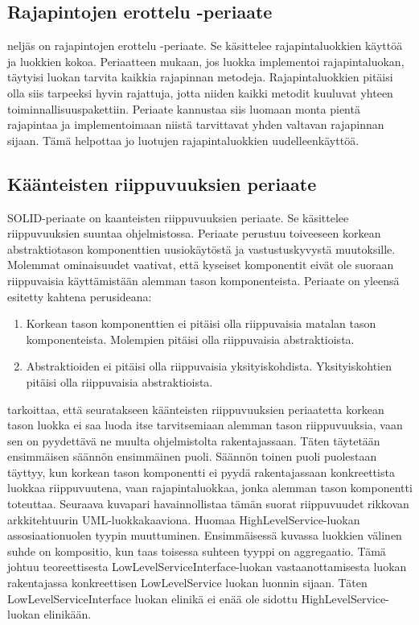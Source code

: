 \documentclass{tufte-book}
\begin{document}
\subsection{Rajapintojen erottelu -periaate}
\label{ISP}

 neljäs on \gls{rajapintojen erottelu -periaate}. Se käsittelee
rajapintaluokkien käyttöä ja luokkien kokoa. Periaatteen mukaan, jos luokka implementoi
rajapintaluokan, täytyisi luokan tarvita kaikkia rajapinnan metodeja. Rajapintaluokkien pitäisi
olla siis tarpeeksi hyvin rajattuja, jotta niiden kaikki metodit kuuluvat yhteen
toiminnallisuuspakettiin. Periaate kannustaa siis luomaan monta pientä rajapintaa ja
implementoimaan niistä tarvittavat yhden valtavan rajapinnan sijaan. Tämä helpottaa jo luotujen
rajapintaluokkien uudelleenkäyttöä.

\subsection{Käänteisten riippuvuuksien periaate}
\label{DIP}

 SOLID-periaate on \gls{kaanteisten riippuvuuksien periaate}. Se
käsittelee riippuvuuksien suuntaa ohjelmistossa. Periaate perustuu toiveeseen korkean
abstraktiotason komponenttien uusiokäytöstä ja vastustuskyvystä muutoksille. Molemmat ominaisuudet
vaativat, että kyseiset komponentit eivät ole suoraan riippuvaisia käyttämistään alemman tason
komponenteista. Periaate on yleensä esitetty kahtena perusideana:

\begin{enumerate}
	\item Korkean tason komponenttien ei pitäisi olla riippuvaisia matalan tason komponenteista. Molempien pitäisi olla riippuvaisia abstraktioista.
	\item Abstraktioiden ei pitäisi olla riippuvaisia yksityiskohdista. Yksityiskohtien pitäisi olla riippuvaisia abstraktioista.
\end{enumerate}

 tarkoittaa, että seuratakseen käänteisten riippuvuuksien periaatetta
korkean tason luokka ei saa luoda itse tarvitsemiaan alemman tason riippuvuuksia, vaan sen on
pyydettävä ne muulta ohjelmistolta rakentajassaan. Täten täytetään ensimmäisen säännön ensimmäinen
puoli. Säännön toinen puoli puolestaan täyttyy, kun korkean tason komponentti ei pyydä
rakentajassaan konkreettista luokkaa riippuvuutena, vaan rajapintaluokkaa, jonka alemman tason
komponentti toteuttaa. Seuraava kuvapari havainnollistaa tämän suorat riippuvuudet rikkovan
arkkitehtuurin \gls{UML}-luokkakaaviona. Huomaa HighLevelService-luokan assosiaationuolen tyypin
muuttuminen. Ensimmäisessä kuvassa luokkien välinen suhde on \gls{kompositio}, kun taas toisessa
suhteen tyyppi on \gls{aggregaatio}. Tämä johtuu teoreettisesta LowLevelServiceInterface-luokan
vastaanottamisesta luokan rakentajassa konkreettisen LowLevelService luokan luonnin sijaan.
Täten LowLevelServiceInterface luokan elinikä ei enää ole sidottu HighLevelService-luokan
elinikään.
\end{document}
